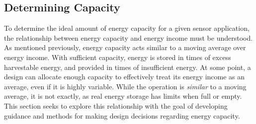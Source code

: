 \subsection{Determining Capacity}
\label{sec:capacity:determining_cap}
To determine the ideal amount of energy capacity for a given sensor application, the relationship between energy capacity and energy income must be understood.
As mentioned previously, energy capacity acts similar to a moving average over energy income. With sufficient capacity, energy is stored in times of excess harvestable energy, and provided in times of insufficient energy.
At some point, a design can allocate enough capacity to effectively treat its energy income as an average, even if it is highly variable.
While the operation is \textit{similar} to a moving average, it is not exactly, as real energy storage has limits when full or empty.
This section seeks to explore this relationship with the goal of developing guidance and methods for making design decisions regarding energy capacity. 

